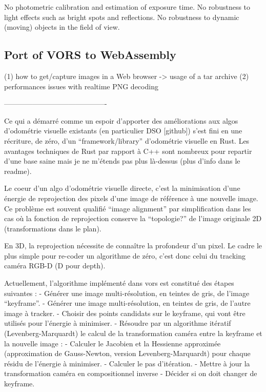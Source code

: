 No photometric calibration and estimation of exposure time.
No robustness to light effects such as bright spots and reflections.
No robustness to dynamic (moving) objects in the field of view.

\subsection{Port of VORS to WebAssembly}%
\label{sub:vors-port-wasm}

(1) how to get/capture images in a Web browser -> usage of a tar archive
(2) performances issues with realtime PNG decoding


-------------------------------------------

Ce qui a démarré comme un espoir d’apporter des améliorations aux algos d’odométrie visuelle existants (en particulier DSO [github]) s’est fini en une récriture, de zéro, d’un “framework/library” d’odométrie visuelle en Rust. Les avantages techniques de Rust par rapport à C++ sont nombreux pour repartir d’une base saine mais je ne m’étends pas plus là-dessus (plus d’info dans le readme).

Le coeur d’un algo d’odométrie visuelle directe, c’est la minimisation d’une énergie de reprojection des pixels d’une image de référence à une nouvelle image. Ce problème est souvent qualifié “image alignment” par simplification dans les cas où la fonction de reprojection conserve la “topologie?” de l’image originale 2D (transformations dans le plan).

En 3D, la reprojection nécessite de connaître la profondeur d’un pixel. Le cadre le plus simple pour re-coder un algorithme de zéro, c’est donc celui du tracking caméra RGB-D (D pour depth).

Actuellement, l’algorithme implémenté dans vors est constitué des étapes suivantes :
- Générer une image multi-résolution, en teintes de gris, de l’image “keyframe”.
- Générer une image multi-résolution, en teintes de gris, de l’autre image à tracker.
- Choisir des points candidats sur le keyframe, qui vont être utilisés pour l’énergie à minimiser.
- Résoudre par un algorithme itératif (Levenberg-Marquardt) le calcul de la transformation caméra entre la keyframe et la nouvelle image :
  - Calculer le Jacobien et la Hessienne approximée (approximation de Gauss-Newton, version Levenberg-Marquardt) pour chaque résidu de l’énergie à minimiser.
  - Calculer le pas d’itération.
  - Mettre à jour la transformation caméra en compositionnel inverse
- Décider si on doit changer de keyframe.

